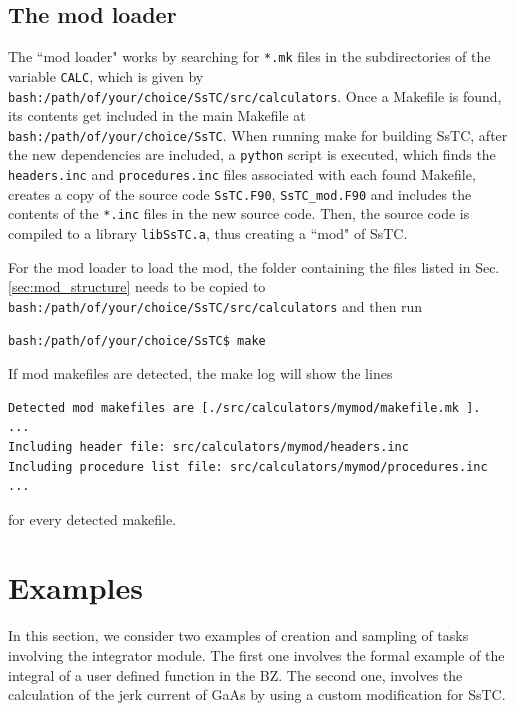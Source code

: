 \documentclass[10pt,a4paper]{article}
\begin{document}
\subsection{The mod loader}\label{sec:mod_loader}
The ``mod loader" works by searching for \verb|*.mk| files in the subdirectories of the variable \verb|CALC|, which is given by \verb|bash:/path/of/your/choice/SsTC/src/calculators|. Once a Makefile is found, its contents get included in the main Makefile at \verb|bash:/path/of/your/choice/SsTC|. When running make for building SsTC, after the new dependencies are included, a \verb|python| script is executed, which finds the \verb|headers.inc| and \verb|procedures.inc| files associated with each found Makefile, creates a copy of the source code \verb|SsTC.F90|, \verb|SsTC_mod.F90| and includes the contents of the \verb|*.inc| files in the new source code. Then, the source code is compiled to a library \verb|libSsTC.a|, thus creating a ``mod" of SsTC.

For the mod loader to load the mod, the folder containing the files listed in Sec. \ref{sec:mod_structure} needs to be copied to \verb|bash:/path/of/your/choice/SsTC/src/calculators| and then run
\begin{codebox}{}
\begin{verbatim}
bash:/path/of/your/choice/SsTC$ make
\end{verbatim}
\end{codebox}
If mod makefiles are detected, the make log will show the lines
\begin{codebox}{}
\begin{verbatim}
Detected mod makefiles are [./src/calculators/mymod/makefile.mk ].
...
Including header file: src/calculators/mymod/headers.inc
Including procedure list file: src/calculators/mymod/procedures.inc
...
\end{verbatim}
\end{codebox}
for every detected makefile.
\section{Examples}
In this section, we consider two examples of creation and sampling of tasks involving the integrator module. The first one involves the formal example of the integral of a user defined function in the BZ. The second one, involves the calculation of the jerk current of GaAs by using a custom modification for SsTC.
\end{document}
